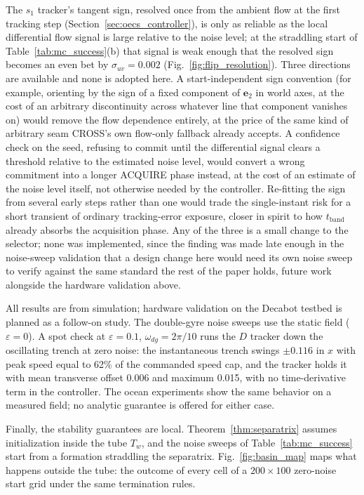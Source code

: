 \documentclass[lettersize,journal]{IEEEtran}
\begin{document}
The $s_1$ tracker's tangent sign, resolved once from the ambient flow
at the first tracking step (Section~\ref{sec:oecs_controller}), is only
as reliable as the local differential flow signal is large relative to
the noise level; at the straddling start of Table~\ref{tab:mc_success}(b)
that signal is weak enough that the resolved sign becomes an even bet
by $\sigma_{uv} = 0.002$ (Fig.~\ref{fig:flip_resolution}). Three
directions are available and none is adopted here. A start-independent
sign convention (for example, orienting by the sign of a fixed
component of $\mathbf{e}_2$ in world axes, at the cost of an arbitrary
discontinuity across whatever line that component vanishes on) would
remove the flow dependence entirely, at the price of the same
kind of arbitrary seam CROSS's own flow-only fallback already accepts.
A confidence check on the seed, refusing to commit until the
differential signal clears a threshold relative to the estimated noise
level, would convert a wrong commitment into a longer ACQUIRE phase
instead, at the cost of an estimate of the noise level itself, not
otherwise needed by the controller. Re-fitting the sign from several
early steps rather than one would trade the single-instant risk for a
short transient of ordinary tracking-error exposure, closer in spirit
to how $t_{\text{band}}$ already absorbs the acquisition phase. Any of
the three is a small change to the selector; none was implemented,
since the finding was made late enough in the noise-sweep validation
that a design change here would need its own noise sweep to verify
against the same standard the rest of the paper holds, future work
alongside the hardware validation above.

All results are from simulation; hardware validation on the Decabot
testbed is planned as a follow-on study. The double-gyre noise sweeps
use the static field ($\varepsilon = 0$). A spot check at
$\varepsilon = 0.1$, $\omega_{dg} = 2\pi/10$ runs the $D$ tracker down
the oscillating trench at zero noise: the instantaneous trench swings
$\pm 0.116$ in $x$ with peak speed equal to 62\% of the commanded
speed cap, and the tracker holds it with mean transverse offset 0.006
and maximum 0.015, with no time-derivative term in the controller. The
ocean experiments show the same behavior on a measured field; no
analytic guarantee is offered for either case.

Finally, the stability guarantees are local. Theorem~\ref{thm:separatrix}
assumes initialization inside the tube $T_w$, and the noise sweeps of
Table~\ref{tab:mc_success} start from a formation straddling the
separatrix. Fig.~\ref{fig:basin_map} maps what happens outside the
tube: the outcome of every cell of a $200 \times 100$ zero-noise start
grid under the same termination rules.
\end{document}
